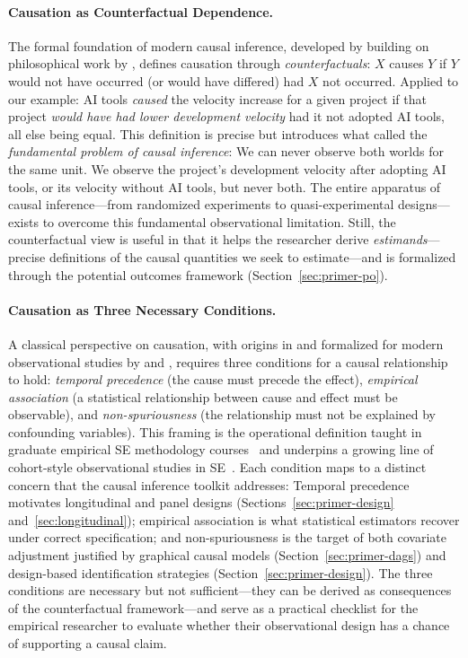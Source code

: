 \paragraph{Causation as Counterfactual Dependence.}
The formal foundation of modern causal inference, developed by \citet{rubin1974estimating} building on philosophical work by \citet{lewis1973causation}, defines causation through \emph{counterfactuals}: $X$ causes $Y$ if $Y$ would not have occurred (or would have differed) had $X$ not occurred.
Applied to our example: AI tools \emph{caused} the velocity increase for a given project if that project \emph{would have had lower development velocity} had it not adopted AI tools, all else being equal.
This definition is precise but introduces what \citet{holland1986statistics} called the \emph{fundamental problem of causal inference}: We can never observe both worlds for the same unit.
We observe the project's development velocity after adopting AI tools, or its velocity without AI tools, but never both.
The entire apparatus of causal inference---from randomized experiments to quasi-experimental designs---exists to overcome this fundamental observational limitation.
Still, the counterfactual view is useful in that it helps the researcher derive \emph{estimands}---precise definitions of the causal quantities we seek to estimate---and is formalized through the potential outcomes framework (Section~\ref{sec:primer-po}).

\paragraph{Causation as Three Necessary Conditions.}
A classical perspective on causation, with origins in \citet{hill1965environment} and formalized for modern observational studies by \citet{rosenbaum2002observational} and \citet{shadish2002experimental}, requires three conditions for a causal relationship to hold: \emph{temporal precedence} (the cause must precede the effect), \emph{empirical association} (a statistical relationship between cause and effect must be observable), and \emph{non-spuriousness} (the relationship must not be explained by confounding variables).
This framing is the operational definition taught in graduate empirical SE methodology courses~\cite{vasilescu17803} and underpins a growing line of cohort-style observational studies in SE~\cite{DBLP:conf/esem/SaarimakiLVJ020}.
Each condition maps to a distinct concern that the causal inference toolkit addresses: Temporal precedence motivates longitudinal and panel designs (Sections~\ref{sec:primer-design} and~\ref{sec:longitudinal}); empirical association is what statistical estimators recover under correct specification; and non-spuriousness is the target of both covariate adjustment justified by graphical causal models (Section~\ref{sec:primer-dags}) and design-based identification strategies (Section~\ref{sec:primer-design}).
The three conditions are necessary but not sufficient---they can be derived as consequences of the counterfactual framework---and serve as a practical checklist for the empirical researcher to evaluate whether their observational design has a chance of supporting a causal claim.

